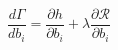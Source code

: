 \begin{equation}\label{eq:C4_functionSensitivityAdjoint}
    \frac{d \Gamma}{d b_i} = 
    \frac{\partial h}{\partial b_i} + 
    \lambda \frac{\partial \mathcal{R}}{\partial b_i}
\end{equation}

%
%
%
%
%
%
